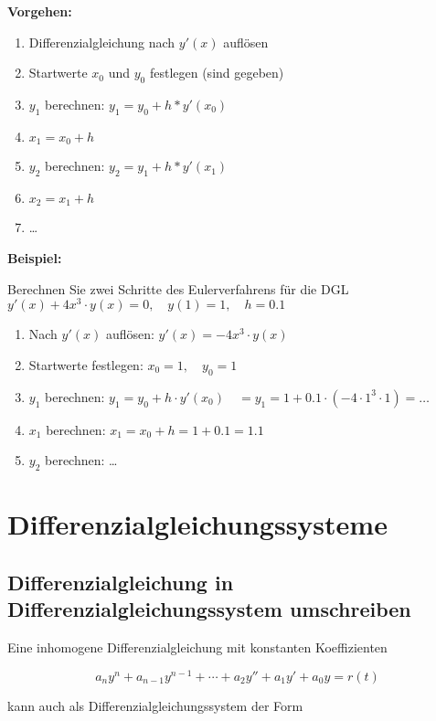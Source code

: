 \documentclass[12pt, a4paper]{scrreprt}
\begin{document}
\textbf{Vorgehen:}
\begin{enumerate}
\item Differenzialgleichung nach \(y'(x)\) auflösen
\item Startwerte \(x_0\) und \(y_0\) festlegen (sind gegeben)
\item \(y_1\) berechnen: \(y_1 = y_0 + h * y'(x_0)\)
\item \(x_1 = x_0 + h\)
\item \(y_2\) berechnen: \(y_2 = y_1 + h * y'(x_1)\)
\item \(x_2 = x_1 + h\)
\item \dots
\end{enumerate}

\textbf{Beispiel:}

\glqq{} Berechnen Sie zwei Schritte des Eulerverfahrens für die DGL \(y'(x) + 4x^3 \cdot y(x) = 0, \quad y(1)= 1,\quad h = 0.1\) \grqq{}

\begin{enumerate}
\item Nach \(y'(x)\) auflösen: \(y'(x) = -4x^3 \cdot y(x)\)
\item Startwerte festlegen: \(x_0 = 1,\quad y_0 = 1\)
\item \(y_1\) berechnen: \(y_1 = y_0 + h \cdot y'(x_0)\quad = y_1 = 1 + 0.1 \cdot (-4\cdot1^3 \cdot 1) = \dots\)
\item \(x_1\) berechnen: \(x_1 = x_0 + h = 1 + 0.1 = 1.1\)
\item \(y_2\) berechnen: \dots
\end{enumerate}

\section{Differenzialgleichungssysteme}

\subsection{Differenzialgleichung in Differenzialgleichungssystem umschreiben}

Eine inhomogene Differenzialgleichung mit konstanten Koeffizienten

\[
  a_ny^{n} + a_{n-1}y^{n-1} + \cdots + a_2y'' + a_1y' + a_0y = r(t)
\]

kann auch als Differenzialgleichungssystem der Form
\end{document}
